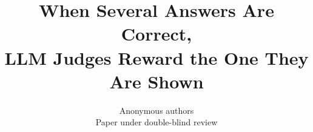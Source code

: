 \documentclass{article}
\title{When Several Answers Are Correct,\\LLM Judges Reward the One They Are Shown}
\author{Anonymous authors\\Paper under double-blind review}
\begin{document}
\maketitle
\raggedbottom

\begin{abstract}

\end{abstract}
\end{document}

